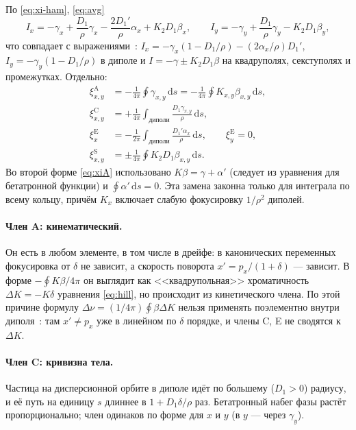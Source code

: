 По \eqref{eq:xi-ham}, \eqref{eq:avg}
\begin{equation}
\label{eq:I-all}
I_x=-\gamma_x+\frac{D_1}{\rho}\gamma_x-\frac{2D_1'}{\rho}\alpha_x+K_2D_1\beta_x,
\qquad
I_y=-\gamma_y+\frac{D_1}{\rho}\gamma_y-K_2D_1\beta_y,
\end{equation}
что совпадает с выражениями~\cite{EqNote}: $I_x=-\gamma_x(1-D_1/\rho)-(2\alpha_x/\rho)D_1'$, $I_y=-\gamma_y(1-D_1/\rho)$ в диполе и $I=-\gamma\pm K_2D_1\beta$ на квадруполях, секступолях и промежутках. Отдельно:
\begin{align}
\label{eq:xiA}
\xi^{\mathrm{A}}_{x,y}&=-\frac{1}{4\pi}\oint\gamma_{x,y}\,\mathrm{d}s
=-\frac{1}{4\pi}\oint K_{x,y}\beta_{x,y}\,\mathrm{d}s,\\
\label{eq:xiC}
\xi^{\mathrm{C}}_{x,y}&=+\frac{1}{4\pi}\int_{\text{диполи}}\frac{D_1\gamma_{x,y}}{\rho}\,\mathrm{d}s,\\
\label{eq:xiE}
\xi^{\mathrm{E}}_{x}&=-\frac{1}{2\pi}\int_{\text{диполи}}\frac{D_1'\alpha_x}{\rho}\,\mathrm{d}s,
\qquad\xi^{\mathrm{E}}_y=0,\\
\label{eq:xiS}
\xi^{\mathrm{S}}_{x,y}&=\pm\frac{1}{4\pi}\oint K_2D_1\beta_{x,y}\,\mathrm{d}s.
\end{align}
Во второй форме \eqref{eq:xiA} использовано $K\beta=\gamma+\alpha'$ (следует из уравнения для бетатронной функции) и $\oint\alpha'\,\mathrm{d}s=0$. Эта замена законна только для интеграла по всему кольцу, причём $K_x$ включает слабую фокусировку $1/\rho^2$ диполей.

\paragraph{Член A: кинематический.}
Он есть в любом элементе, в том числе в дрейфе: в канонических переменных фокусировка от $\delta$ не зависит, а скорость поворота $x'=p_x/(1+\delta)$ --- зависит. В форме $-\oint K\beta/4\pi$ он выглядит как <<квадрупольная>> хроматичность $\Delta K=-K\delta$ уравнения \eqref{eq:hill}, но происходит из кинетического члена. По этой причине формулу $\Delta\nu=(1/4\pi)\oint\beta\Delta K$ нельзя применять поэлементно внутри диполя~\cite{EqNote}: там $x'\neq p_x$ уже в линейном по $\delta$ порядке, и члены C, E не сводятся к $\Delta K$.

\paragraph{Член C: кривизна тела.}
Частица на дисперсионной орбите в диполе идёт по большему ($D_1>0$) радиусу, и её путь на единицу $s$ длиннее в $1+D_1\delta/\rho$ раз. Бетатронный набег фазы растёт пропорционально; член одинаков по форме для $x$ и $y$ (в $y$ --- через $\gamma_y$).

